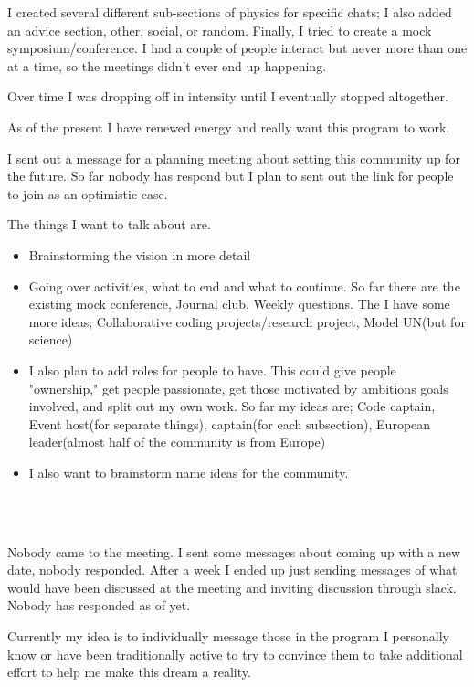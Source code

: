\par I created several different sub-sections of physics for specific chats; I also added an advice section, other, social, or random. Finally, I tried to create a mock symposium/conference. I had a couple of people interact but never more than one at a time, so the meetings didn't ever end up happening. 
\par Over time I was dropping off in intensity until I eventually stopped altogether.
\\
\par As of the present I have renewed energy and really want this program to work.
\par I sent out a message for a planning meeting about setting this community up for the future. So far nobody has respond but I plan to sent out the link for people to join as an optimistic case.
\par The things I want to talk about are.
\begin{itemize}
    \item Brainstorming the vision in more detail
    \item Going over activities, what to end and what to continue. So far there are the existing mock conference, Journal club, Weekly questions. The I have some more ideas; Collaborative coding projects/research project, Model UN(but for science)
    \item I also plan to add roles for people to have. This could give people "ownership," get people passionate, get those motivated by ambitions goals involved, and split out my own work. So far my ideas are; Code captain, Event host(for separate things), \underline{\hspace{1cm}} captain(for each subsection), European leader(almost half of the community is from Europe)
    \item I also want to brainstorm name ideas for the community.


\end{itemize}
\\
\\

\par Nobody came to the meeting. I sent some messages about coming up with a new date, nobody responded. After a week I ended up just sending messages of what would have been discussed at the meeting and inviting discussion through slack. Nobody has responded as of yet. 
\par Currently my idea is to individually message those in the program I personally know or have been traditionally active to try to convince them to take additional effort to help me make this dream a reality.
